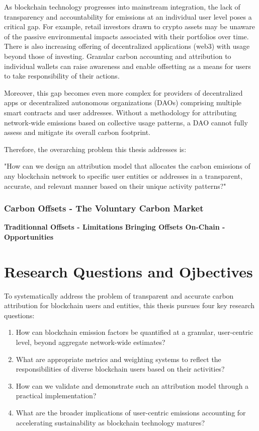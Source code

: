 \documentclass[11pt]{report}
\begin{document}
As blockchain technology progresses into mainstream integration, the lack of transparency and accountability for emissions at an individual user level poses a critical gap. For example, retail investors drawn to crypto assets may be unaware of the passive environmental impacts associated with their portfolios over time. There is also increasing offering of decentralized applications (web3) with usage beyond those of investing. Granular carbon accounting and attribution to individual wallets can raise awareness and enable offsetting as a means for users to take responsibility of their actions.

Moreover, this gap becomes even more complex for providers of decentralized apps or decentralized autonomous organizations (DAOs) comprising multiple smart contracts and user addresses. Without a methodology for attributing network-wide emissions based on collective usage patterns, a DAO cannot fully assess and mitigate its overall carbon footprint.

Therefore, the overarching problem this thesis addresses is:

"How can we design an attribution model that allocates the carbon emissions of any blockchain network to specific user entities or addresses in a transparent, accurate, and relevant manner based on their unique activity patterns?"

\subsubsection{Carbon Offsets - The Voluntary Carbon Market}
\textbf{Traditionnal Offsets - Limitations}
\textbf{Bringing Offsets On-Chain - Opportunities }

\section{Research Questions and Ojbectives}

To systematically address the problem of transparent and accurate carbon attribution for blockchain users and entities, this thesis pursues four key research questions:

\begin{enumerate}
    \item How can blockchain emission factors be quantified at a granular, user-centric level, beyond aggregate network-wide estimates?
    \item What are appropriate metrics and weighting systems to reflect the responsibilities of diverse blockchain users based on their activities?
    \item How can we validate and demonstrate such an attribution model through a practical implementation?
    \item What are the broader implications of user-centric emissions accounting for accelerating sustainability as blockchain technology matures?
\end{enumerate}
\end{document}
